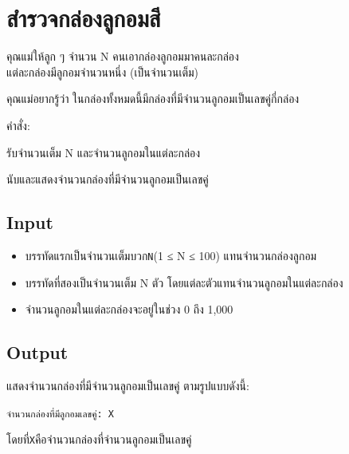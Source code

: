 \documentclass{article}
\begin{document}
\section*{สำรวจกล่องลูกอมสี}

คุณแม่ให้ลูก ๆ จำนวน N คนเอากล่องลูกอมมาคนละกล่อง\\

แต่ละกล่องมีลูกอมจำนวนหนึ่ง (เป็นจำนวนเต็ม)



คุณแม่อยากรู้ว่า ในกล่องทั้งหมดนี้มีกล่องที่มีจำนวนลูกอมเป็นเลขคู่กี่กล่อง



คำสั่ง:



รับจำนวนเต็ม N และจำนวนลูกอมในแต่ละกล่อง



นับและแสดงจำนวนกล่องที่มีจำนวนลูกอมเป็นเลขคู่



\subsection*{Input}
\begin{itemize}

\item

  บรรทัดแรกเป็นจำนวนเต็มบวก\texttt{N}(1 ≤ N ≤ 100) แทนจำนวนกล่องลูกอม

\item

  บรรทัดที่สองเป็นจำนวนเต็ม N ตัว โดยแต่ละตัวแทนจำนวนลูกอมในแต่ละกล่อง

\item

  จำนวนลูกอมในแต่ละกล่องจะอยู่ในช่วง 0 ถึง 1,000

\end{itemize}



\subsection*{Output}
แสดงจำนวนกล่องที่มีจำนวนลูกอมเป็นเลขคู่ ตามรูปแบบดังนี้:



\texttt{จำนวนกล่องที่มีลูกอมเลขคู่:\ X}



โดยที่\texttt{X}คือจำนวนกล่องที่จำนวนลูกอมเป็นเลขคู่
\end{document}
